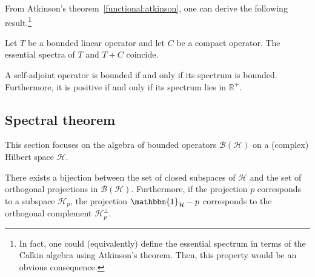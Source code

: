 
    From Atkinson's theorem~\ref{functional:atkinson}, one can derive the following result.\footnote{In fact, one could (equivalently) define the essential spectrum in terms of the Calkin algebra using Atkinson's theorem. Then, this property would be an obvious consequence.}
    \begin{property}
        Let $T$ be a bounded linear operator and let $C$ be a compact operator. The essential spectra of $T$ and $T+C$ coincide.
    \end{property}

    \begin{property}
        A self-adjoint operator is bounded if and only if its spectrum is bounded. Furthermore, it is positive if and only if its spectrum lies in $\mathbb{R}^+$.
    \end{property}

\subsection{Spectral theorem}\label{section:PVM}

    This section focuses on the algebra of bounded operators $\mathcal{B}(\mathcal{H})$ on a (complex) Hilbert space $\mathcal{H}$.

    \begin{property}
        There exists a bijection between the set of closed subspaces of $\mathcal{H}$ and the set of orthogonal projections in $\mathcal{B}(\mathcal{H})$. Furthermore, if the projection $p$ corresponds to a subspace $\mathcal{H}_p$, the projection $\mathbbm{1}_{\mathcal{H}}-p$ corresponds to the orthogonal complement $\mathcal{H}_p^\perp$.
    \end{property}

